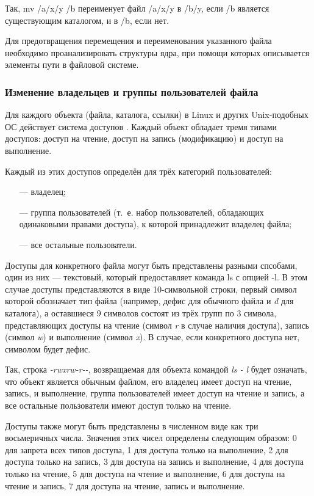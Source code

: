Так, mv /a/x/y /b переименует файл /a/x/y в /b/y, если /b является существующим каталогом, и в /b, если нет.

Для предотвращения перемещения и переименования указанного файла необходимо проанализировать структуры ядра, при помощи которых описывается элементы пути в файловой системе.

\subsubsection{Изменение владельцев и группы пользователей файла}

Для каждого объекта (файла, каталога, ссылки) в Linux и других Unix-подобных ОС действует система доступов \cite{permission-definition}. Каждый объект обладает тремя типами доступов: доступ на чтение, доступ на запись (модификацию) и доступ на выполнение. 

Каждый из этих доступов определён для трёх категорий пользователей:  
\begin{itemize}[leftmargin=1.6\parindent]
	\item[---] владелец;
	\item[---] группа пользователей (т.~е. набор пользователей, обладающих одинаковыми правами доступа), к которой принадлежит владелец файла; 
	\item[---] все остальные пользователи.
\end{itemize}

Доступы для конкретного файла могут быть представлены разными спсобами, один из них --- текстовый, который предоставляет команда ls с опцией -l. В этом случае доступы представляются в виде 10-символьной строки, первый символ которой обозначает тип файла (например, дефис для обычного файла и \textit{d} для каталога), а оставшиеся 9 символов состоят из трёх групп по 3 символа, представляющих доступы на чтение (символ \textit{r} в случае наличия доступа), запись (символ \textit{w}) и выполнение (символ \textit{x}). В случае, если конкретного доступа нет, символом будет дефис.

Так, строка \textit{-rwxrw-r-\--}, возвращаемая для объекта командой \textit{ls - l} будет означать, что объект является обычным файлом, его владелец имеет доступ на чтение, запись, и выполнение, группа пользователей имеет доступ на чтение и запись, а все остальные пользователи имеют доступ только на чтение.

Доступы также могут быть представлены в численном виде как три восьмеричных числа. Значения этих чисел определены следующим образом: 0 для запрета всех типов доступа, 1 для доступа только на выполнение, 2 для доступа только на запись, 3 для доступа на запись и выполнение, 4 для доступа только на чтение, 5 для доступа на чтение и выполнение, 6 для доступа на чтение и запись, 7 для доступа на чтение, запись и выполнение.

